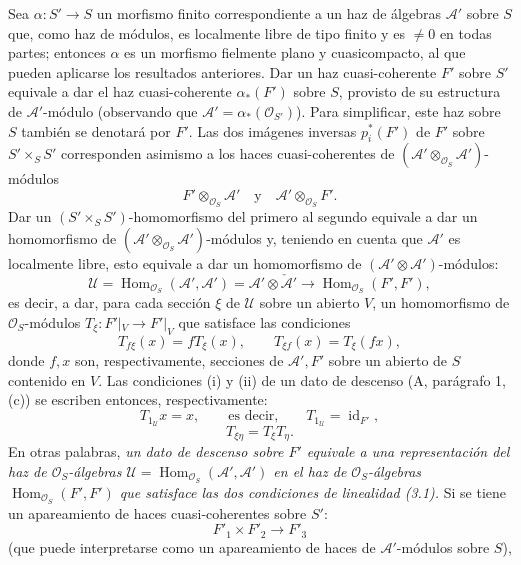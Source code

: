 \documentclass[11pt,twoside,openany]{book}
\numberwithin{equation}{section}
\theoremstyle{plain}
\theoremstyle{definition}
\theoremstyle{remark}
\theoremstyle{plain}
\theoremstyle{definition}
\theoremstyle{remark}
\begin{document}
Sea $\alpha:S'\longrightarrow S$ un morfismo finito correspondiente a un haz de
álgebras $\mathcal A'$ sobre $S$ que, como haz de módulos, es localmente libre
de tipo finito y es $\ne0$ en todas partes; entonces $\alpha$ es un morfismo
fielmente plano y cuasicompacto, al que pueden aplicarse los resultados
anteriores. Dar un haz cuasi-coherente $F'$ sobre $S'$ equivale a dar el haz
cuasi-coherente $\alpha_*(F')$ sobre $S$, provisto de su estructura de
$\mathcal A'$-módulo (observando que
$\mathcal A'=\alpha_*(\mathcal O_{S'})$). Para simplificar, este haz sobre $S$
también se denotará por $F'$. Las dos imágenes inversas $p_i^*(F')$ de $F'$
sobre $S'\times_SS'$ corresponden asimismo a los haces cuasi-coherentes de
$(\mathcal A'\otimes_{\mathcal O_S}\mathcal A')$-módulos
\[
  F'\otimes_{\mathcal O_S}\mathcal A'
  \quad\text{y}\quad
  \mathcal A'\otimes_{\mathcal O_S}F'.
\]
Dar un $(S'\times_SS')$-homomorfismo del primero al segundo equivale a dar un
homomorfismo de $(\mathcal A'\otimes_{\mathcal O_S}\mathcal A')$-módulos y,
teniendo en cuenta que $\mathcal A'$ es localmente libre, esto equivale a dar
un homomorfismo de $(\mathcal A'\otimes\mathcal A')$-módulos:
\[
  \mathcal U=
  \operatorname{Hom}_{\mathcal O_S}(\mathcal A',\mathcal A')
  =\mathcal A'\otimes\check{\mathcal A}'
  \longrightarrow
  \operatorname{Hom}_{\mathcal O_S}(F',F'),
\]
es decir, a dar, para cada sección $\xi$ de $\mathcal U$ sobre un abierto $V$,
un homomorfismo de $\mathcal O_S$-módulos
$T_\xi:F'|_V\longrightarrow F'|_V$ que satisface las condiciones
\begin{equation}
  T_{f\xi}(x)=fT_\xi(x),
  \qquad T_{\xi f}(x)=T_\xi(fx),
  \tag{3.1}
\end{equation}
donde $f,x$ son, respectivamente, secciones de $\mathcal A',F'$ sobre un
abierto de $S$ contenido en $V$. Las condiciones (i) y (ii) de un dato de
descenso (A, parágrafo 1, (c)) se escriben entonces, respectivamente:
\begin{equation}
  T_{1_{\mathcal U}}x=x,
  \qquad\text{es decir,}\qquad
  T_{1_{\mathcal U}}=\operatorname{id}_{F'},
  \tag{3.2}
\end{equation}
\begin{equation}
  T_{\xi\eta}=T_\xi T_\eta.
  \tag{3.3}
\end{equation}
En otras palabras, \emph{un dato de descenso sobre $F'$ equivale a una
representación del haz de $\mathcal O_S$-álgebras
$\mathcal U=\operatorname{Hom}_{\mathcal O_S}(\mathcal A',\mathcal A')$ en el
haz de $\mathcal O_S$-álgebras
$\operatorname{Hom}_{\mathcal O_S}(F',F')$ que satisface las dos condiciones de
linealidad (3.1).} Si se tiene un apareamiento de haces cuasi-coherentes sobre
$S'$:
\[
  F'_1\times F'_2\longrightarrow F'_3
\]
(que puede interpretarse como un apareamiento de haces de
$\mathcal A'$-módulos sobre $S$),
\end{document}
